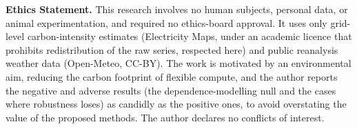 \documentclass[12pt]{article}
\begin{document}
\begin{titlepage}
\vspace{0.6cm}
\begin{minipage}{0.9\textwidth}\small
\textbf{Ethics Statement.} This research involves no human subjects, personal data, or
animal experimentation, and required no ethics-board approval. It uses only
grid-level carbon-intensity estimates (Electricity Maps, under an academic licence that
prohibits redistribution of the raw series, respected here) and public reanalysis
weather data (Open-Meteo, CC-BY). The work is motivated by an environmental aim,
reducing the carbon footprint of flexible compute, and the author reports the negative
and adverse results (the dependence-modelling null and the cases where robustness loses)
as candidly as the positive ones, to avoid overstating the value of the proposed
methods. The author declares no conflicts of interest.
\end{minipage}
\end{titlepage}

\end{document}
